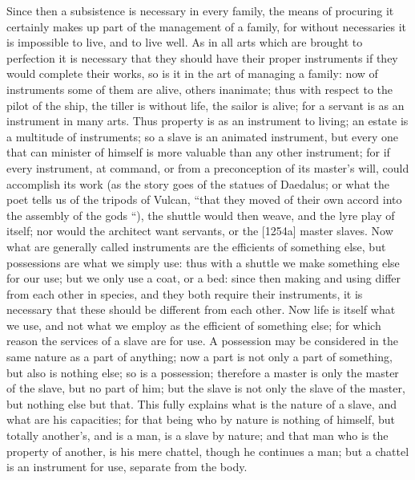 
Since then a subsistence is necessary in every family, the means of
procuring it certainly makes up part of the management of a family, for
without necessaries it is impossible to live, and to live well. As in all
arts which are brought to perfection it is necessary that they should have
their proper instruments if they would complete their works, so is it in
the art of managing a family: now of instruments some of them are alive,
others inanimate; thus with respect to the pilot of the ship, the tiller
is without life, the sailor is alive; for a servant is as an instrument in
many arts. Thus property is as an instrument to living; an estate is a
multitude of instruments; so a slave is an animated instrument, but every
one that can minister of himself is more valuable than any other
instrument; for if every instrument, at command, or from a preconception
of its master's will, could accomplish its work (as the story goes of the
statues of Daedalus; or what the poet tells us of the tripods of Vulcan,
``that they moved of their own accord into the assembly of the gods ``), the
shuttle would then weave, and the lyre play of itself; nor would the
architect want servants, or the [1254a] master slaves. Now what are
generally called instruments are the efficients of something else, but
possessions are what we simply use: thus with a shuttle we make something
else for our use; but we only use a coat, or a bed: since then making and
using differ from each other in species, and they both require their
instruments, it is necessary that these should be different from each
other. Now life is itself what we use, and not what we employ as the
efficient of something else; for which reason the services of a slave are
for use. A possession may be considered in the same nature as a part of
anything; now a part is not only a part of something, but also is nothing
else; so is a possession; therefore a master is only the master of the
slave, but no part of him; but the slave is not only the slave of the
master, but nothing else but that. This fully explains what is the nature
of a slave, and what are his capacities; for that being who by nature is
nothing of himself, but totally another's, and is a man, is a slave by
nature; and that man who is the property of another, is his mere chattel,
though he continues a man; but a chattel is an instrument for use,
separate from the body.


